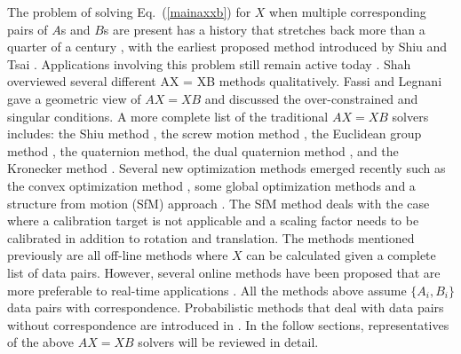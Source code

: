 \documentclass[twocolumn,10pt]{asme2ej}
\newcommand{\ttt}{{\bf t}}
\begin{document}
The problem of solving Eq.~(\ref{mainaxxb}) for $X$ when multiple corresponding pairs of $A$s and $B$s are present has a history that stretches back more than a quarter of a century
\cite{chou1991finding, park1994robot,shiu1989calibration}, with the earliest proposed method introduced by Shiu \cite{shiu1987finding, shiu1989calibration} and Tsai \cite{tsai1989new}. Applications involving this problem still remain active today \cite{kim,dai}. Shah \cite{shah2012overview} overviewed several different AX = XB methods qualitatively. Fassi and Legnani \cite{fassi2005hand} gave a geometric view of $AX=XB$ and discussed the over-constrained and singular conditions. A more complete list of the traditional $AX=XB$ solvers includes: the Shiu method \cite{shiu1989calibration}, the screw motion method \cite{chen91,zhao2006hand}, the Euclidean group method \cite{park1994robot,gwak2003numerical}, the quaternion method\cite{chou1988quaternions, chou1991finding, horaud1995hand}, the dual quaternion method \cite{daniilidis1996dual, daniilidis1999hand}, and the Kronecker method \cite{andreff1999line,andreff2001robot}. Several new optimization methods emerged recently such as the convex optimization method \cite{zhao2011hand}, some global optimization methods  \cite{seo2009branch,andreff2001robot,heller2014hand} and a structure from motion (SfM) approach \cite{schmidt2005calibration}. The SfM method deals with the case where a calibration target is not applicable and a scaling factor needs to be calibrated in addition to rotation and translation. The methods mentioned previously are all off-line methods where $X$ can be calculated given a complete list of data pairs. However, several online methods have been 
proposed that are more preferable to real-time applications \cite{andreff1999line,angeles2000online,ackerman2014online}. All the methods above assume $\{A_i, B_i\}$ data pairs with correspondence. Probabilistic methods that deal with data pairs without correspondence are introduced in \cite{ackermanGSI, ackerman2014information}. In the follow sections, representatives of the above $AX=XB$ solvers will be reviewed in detail.

\end{document}
